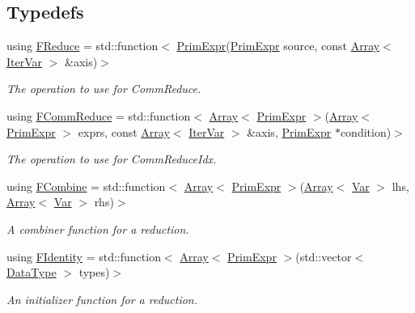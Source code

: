\subsection*{Typedefs}
\begin{DoxyCompactItemize}
\item 
using \hyperlink{namespacetopi_a4d0f5ddce836d926393ac3d154170ef6}{F\+Reduce} = std\+::function$<$ \hyperlink{classtvm_1_1PrimExpr}{Prim\+Expr}(\hyperlink{classtvm_1_1PrimExpr}{Prim\+Expr} source, const \hyperlink{classtvm_1_1Array}{Array}$<$ \hyperlink{classtvm_1_1tir_1_1IterVar}{Iter\+Var} $>$ \&axis)$>$
\begin{DoxyCompactList}\small\item\em The operation to use for Comm\+Reduce. \end{DoxyCompactList}\item 
using \hyperlink{namespacetopi_a8baac534d5ff12a20f089736a0e60f14}{F\+Comm\+Reduce} = std\+::function$<$ \hyperlink{classtvm_1_1Array}{Array}$<$ \hyperlink{classtvm_1_1PrimExpr}{Prim\+Expr} $>$(\hyperlink{classtvm_1_1Array}{Array}$<$ \hyperlink{classtvm_1_1PrimExpr}{Prim\+Expr} $>$ exprs, const \hyperlink{classtvm_1_1Array}{Array}$<$ \hyperlink{classtvm_1_1tir_1_1IterVar}{Iter\+Var} $>$ \&axis, \hyperlink{classtvm_1_1PrimExpr}{Prim\+Expr} $\ast$condition)$>$
\begin{DoxyCompactList}\small\item\em The operation to use for Comm\+Reduce\+Idx. \end{DoxyCompactList}\item 
using \hyperlink{namespacetopi_afa9b3b014bd552948f6fd671465901fa}{F\+Combine} = std\+::function$<$ \hyperlink{classtvm_1_1Array}{Array}$<$ \hyperlink{classtvm_1_1PrimExpr}{Prim\+Expr} $>$(\hyperlink{classtvm_1_1Array}{Array}$<$ \hyperlink{classtvm_1_1tir_1_1Var}{Var} $>$ lhs, \hyperlink{classtvm_1_1Array}{Array}$<$ \hyperlink{classtvm_1_1tir_1_1Var}{Var} $>$ rhs)$>$
\begin{DoxyCompactList}\small\item\em A combiner function for a reduction. \end{DoxyCompactList}\item 
using \hyperlink{namespacetopi_a180676c7dc5c5716056719a58b60ca2c}{F\+Identity} = std\+::function$<$ \hyperlink{classtvm_1_1Array}{Array}$<$ \hyperlink{classtvm_1_1PrimExpr}{Prim\+Expr} $>$(std\+::vector$<$ \hyperlink{namespacetvm_a41918af1a1dc386388639a9d3ad06c5d}{Data\+Type} $>$ types)$>$
\begin{DoxyCompactList}\small\item\em An initializer function for a reduction. \end{DoxyCompactList}\end{DoxyCompactItemize}

